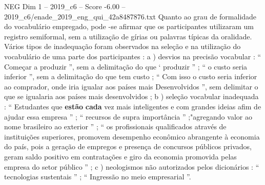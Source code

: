 \begin{textsample}{NEG Dim 1 – 2019\_c6 – Score -6.00 – 2019\_c6/enade\_2019\_eng\_qui\_42a8487876.txt}
Quanto ao grau de formalidade do vocabulário empregado, pode -se afirmar que os participantes utilizaram um registro semiformal, sem a utilização de gírias ou palavras típicas da oralidade.
Vários tipos de inadequação foram observados na seleção e na utilização do vocabulário de uma parte dos participantes : a ) desvios na precisão vocabular : “ Começar a produzir ”, sem a delimitação do que ‘ produzir ” ; “ o custo seria inferior ”, sem a delimitação do que tem custo ; “ Com isso o custo seria inferior ao comprador, onde iria igualar aos países mais Desenvolvidos ”, sem delimitar o que se igualaria aos países mais desenvolvidos ; b ) seleção vocabular inadequada : “ Estudantes que \textbf{estão} \textbf{cada} vez mais inteligentes e com grandes ideias afim de ajudar essa empresa ” ; “ recursos de supra importância ” ;"agregando valor ao nome brasileiro ao exterior ” ; “ os profissionais qualificados através de instituições superiores, promovem desempenho econômico abrangente à economia do país, pois a geração de empregos e presença de concursos públicos privados, geram saldo positivo em contratações e giro da economia promovida pelas empresa do setor público ” ; c ) neologismos não autorizados pelos dicionários : “ tecnologias sustentais ” ; “ Ingressão no meio empresarial ”.

\end{textsample}
